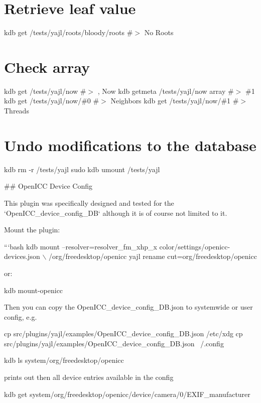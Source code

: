 \section*{Retrieve leaf value}

kdb get /tests/yajl/roots/bloody/roots \#$>$ No Roots

\section*{Check array}

kdb get /tests/yajl/now \#$>$ , Now kdb getmeta /tests/yajl/now array \#$>$ \#1 kdb get /tests/yajl/now/\#0 \#$>$ Neighbors kdb get /tests/yajl/now/\#1 \#$>$ Threads

\section*{Undo modifications to the database}

kdb rm -\/r /tests/yajl sudo kdb umount /tests/yajl 
\begin{DoxyCode}
## OpenICC Device Config

This plugin was specifically designed and tested for the
`OpenICC\_device\_config\_DB` although it is of course not limited
to it.

Mount the plugin:

```bash
kdb mount --resolver=resolver\_fm\_xhp\_x color/settings/openicc-devices.json \(\backslash\)
  /org/freedesktop/openicc yajl rename cut=org/freedesktop/openicc
\end{DoxyCode}


or\+:


\begin{DoxyCode}
kdb mount-openicc
\end{DoxyCode}


Then you can copy the {\ttfamily Open\+I\+C\+C\+\_\+device\+\_\+config\+\_\+\+D\+B.\+json} to systemwide or user config, e.\+g.


\begin{DoxyCode}
cp src/plugins/yajl/examples/OpenICC\_device\_config\_DB.json /etc/xdg
cp src/plugins/yajl/examples/OpenICC\_device\_config\_DB.json ~/.config

kdb ls system/org/freedesktop/openicc
\end{DoxyCode}


prints out then all device entries available in the config


\begin{DoxyCode}
kdb get system/org/freedesktop/openicc/device/camera/0/EXIF\_manufacturer
\end{DoxyCode}


